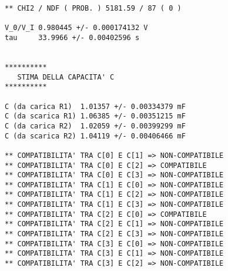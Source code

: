 {\begin{verbatim}
** CHI2 / NDF ( PROB. ) 5181.59 / 87 ( 0 )

V_0/V_I 0.980445 +/- 0.000174132 V
tau     33.9966 +/- 0.00402596 s


**********
   STIMA DELLA CAPACITA' C 
**********

C (da carica R1)  1.01357 +/- 0.00334379 mF
C (da scarica R1) 1.06385 +/- 0.00351215 mF
C (da carica R2)  1.02059 +/- 0.00399299 mF
C (da scarica R2) 1.04119 +/- 0.00406466 mF

** COMPATIBILITA' TRA C[0] E C[1] => NON-COMPATIBILE
** COMPATIBILITA' TRA C[0] E C[2] => COMPATIBILE
** COMPATIBILITA' TRA C[0] E C[3] => NON-COMPATIBILE
** COMPATIBILITA' TRA C[1] E C[0] => NON-COMPATIBILE
** COMPATIBILITA' TRA C[1] E C[2] => NON-COMPATIBILE
** COMPATIBILITA' TRA C[1] E C[3] => NON-COMPATIBILE
** COMPATIBILITA' TRA C[2] E C[0] => COMPATIBILE
** COMPATIBILITA' TRA C[2] E C[1] => NON-COMPATIBILE
** COMPATIBILITA' TRA C[2] E C[3] => NON-COMPATIBILE
** COMPATIBILITA' TRA C[3] E C[0] => NON-COMPATIBILE
** COMPATIBILITA' TRA C[3] E C[1] => NON-COMPATIBILE
** COMPATIBILITA' TRA C[3] E C[2] => NON-COMPATIBILE

\end{verbatim}
}